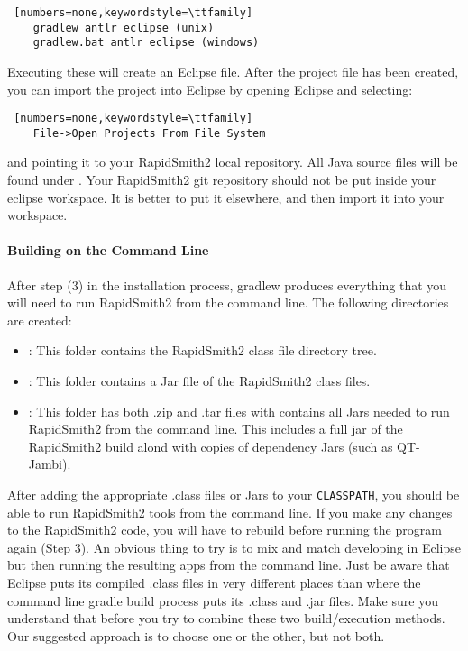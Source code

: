 \begin{enumerate}
\begin{lstlisting} [numbers=none,keywordstyle=\ttfamily]
	gradlew antlr eclipse (unix)       
	gradlew.bat antlr eclipse (windows)
\end{lstlisting}
  
  Executing these will create an Eclipse  file. After the project
  file has been created, you can import the project into Eclipse by opening
  Eclipse and selecting:
  
\begin{lstlisting} [numbers=none,keywordstyle=\ttfamily]
	File->Open Projects From File System 
\end{lstlisting}
  
  and pointing it to your RapidSmith2 local repository. All Java source files
  will be found under .  Your RapidSmith2 git repository
  should not be put inside your eclipse workspace. It is better to put it
  elsewhere, and then import it into your workspace.
  \paragraph{Building on the Command Line} After step (3) in the installation
  process, gradlew produces everything that you will need to run RapidSmith2 from the
  command line. The following directories are created: 
  \begin{itemize}
    \item {}: This folder contains the RapidSmith2 class file
    directory tree.
    \item {}: This folder contains a Jar file of the RapidSmith2 class
    files.
    \item {}: This folder has both .zip and .tar files
    with contains all Jars needed to run RapidSmith2 from the command line. This
    includes a full jar of the RapidSmith2 build alond with copies of dependency Jars
    (such as QT-Jambi).
  \end{itemize} 
  After adding the appropriate .class files or Jars to your \texttt{CLASSPATH},
  you should be able to run RapidSmith2 tools from the command line. If you make any
  changes to the RapidSmith2 code, you will have to rebuild before running the program
  again (Step 3).  An obvious thing to try is to mix and match
  developing in Eclipse but then running the resulting apps from the command
  line. Just be aware that Eclipse puts its compiled .class files in very
  different places than where the command line gradle build process puts its
  .class and .jar files. Make sure you understand that before you try to combine these two
  build/execution methods. Our suggested approach is to choose one or the
  other, but not both.
\end{enumerate}

